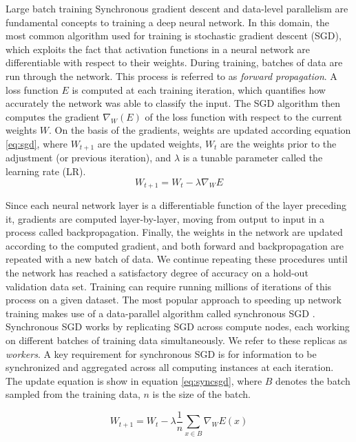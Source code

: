 \begin{section}{Large batch training}
	\label{sec:training}
	Synchronous gradient descent and data-level parallelism are fundamental concepts to training a deep neural network. In this domain, the most common algorithm used for training is stochastic gradient descent (SGD), which exploits the fact that activation functions in a neural network are differentiable with respect to their weights. During training, batches of data are run through the network. This process is referred to as \emph{forward propagation}.  A loss function $E$ is computed at each training iteration, which quantifies how accurately the network was able to classify the input. The SGD algorithm then computes the gradient $\nabla_{W}(E)$ of the loss function with respect to the current weights $W$. On the basis of the gradients, weights are updated according equation \ref{eq:sgd}, where $W_{t+1}$ are the updated weights, $W_{t}$ are the weights prior to the adjustment (or previous iteration), and $\lambda$ is a tunable parameter called the learning rate (LR).
	\begin{equation}
		W_{t+1} = W_{t} - \lambda \nabla_{W} E
		\label{eq:sgd}
	\end{equation}

	\noindent Since each neural network layer is a differentiable function of the layer preceding it, gradients are computed layer-by-layer, moving from output to input in a process called backpropagation. Finally, the weights in the network are updated according to the computed gradient, and both forward and backpropagation are  repeated with a new batch of data. We continue repeating these procedures until the network has reached a satisfactory degree of accuracy on a hold-out validation data set. Training can require running millions of iterations of this process on a given dataset. The most popular approach to speeding up network training makes use of a data-parallel algorithm called synchronous SGD \cite{Robbins1951}. Synchronous SGD works by replicating SGD across compute nodes, each working on different batches of training data simultaneously. We refer to these replicas as \textit{workers}. A key requirement for synchronous SGD is for information to be synchronized and aggregated across all computing instances at each iteration. The update equation is show in equation \ref{eq:syncsgd}, where $B$ denotes the batch sampled from the training data, $n$ is the size of the batch.

	\begin{equation}
		W_{t+1} = W_{t} - \lambda \frac{1}{n} \sum_{x \in B} \nabla_{W}E(x)
		\label{eq:syncsgd}
	\end{equation}


\end{section}
